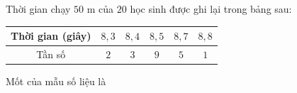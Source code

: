 \begin{ex}
Thời gian chạy $50$ m của $20$ học sinh được ghi lại trong bảng sau:
\begin{center}
\begin{tabular}{|c|c|c|c|c|c|}\hline
Thời gian (giây) & $8{,}3$ & $8{,}4$ & $8{,}5$ & $8{,}7$ & $8{,}8$\\\hline
Tần số & $2$ & $3$ & $9$ & $5$ & $1$\\\hline
\end{tabular}
\end{center}
Mốt của mẫu số liệu là
\end{ex}
